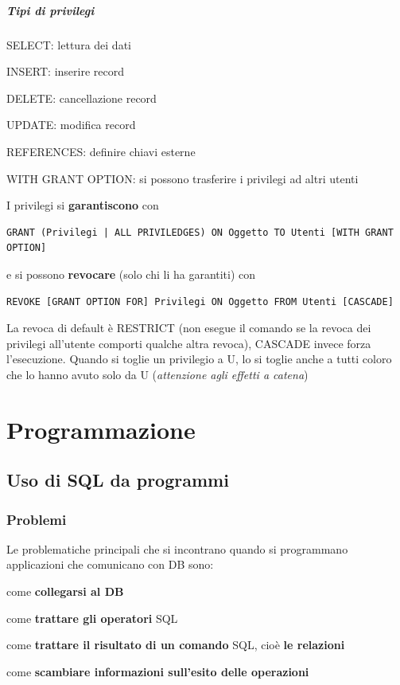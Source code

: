 \documentclass[10pt]{book}
\begin{document}
\paragraph{Tipi di privilegi}
\begin{list}{}{}
	\item SELECT: lettura dei dati
	\item INSERT: inserire record
	\item DELETE: cancellazione record
	\item UPDATE: modifica record
	\item REFERENCES: definire chiavi esterne
	\item WITH GRANT OPTION: si possono trasferire i privilegi ad altri utenti
\end{list}
I privilegi si \textbf{garantiscono} con
\begin{lstlisting}
GRANT (Privilegi | ALL PRIVILEDGES) ON Oggetto TO Utenti [WITH GRANT OPTION]
\end{lstlisting}
e si possono \textbf{revocare} (solo chi li ha garantiti) con
\begin{lstlisting}
REVOKE [GRANT OPTION FOR] Privilegi ON Oggetto FROM Utenti [CASCADE]
\end{lstlisting}
La revoca di default è RESTRICT (non esegue il comando se la revoca dei privilegi all'utente comporti qualche altra revoca), CASCADE invece forza l'esecuzione. Quando si toglie un privilegio a U, lo si toglie anche a tutti coloro che lo hanno avuto solo da U (\textit{attenzione agli effetti a catena})
\chapter{Programmazione}
\section{Uso di SQL da programmi}
\subsection{Problemi} Le problematiche principali che si incontrano quando si programmano applicazioni che comunicano con DB sono:
\begin{list}{}{}
	\item come \textbf{collegarsi al DB}
	\item come \textbf{trattare gli operatori} SQL
	\item come \textbf{trattare il risultato di un comando} SQL, cioè \textbf{le relazioni}
	\item come \textbf{scambiare informazioni sull'esito delle operazioni}
\end{list}
\end{document}
